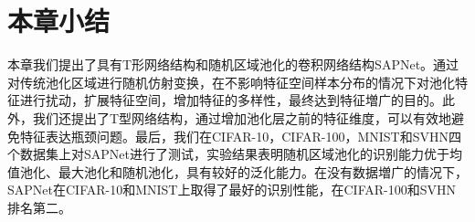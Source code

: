 \section{本章小结}
\label{sec:sap:conclude}


本章我们提出了具有T形网络结构和随机区域池化的卷积网络结构SAPNet。通过对传统池化区域进行随机仿射变换，在不影响特征空间样本分布的情况下对池化特征进行扰动，扩展特征空间，增加特征的多样性，最终达到特征増广的目的。此外，我们还提出了T型网络结构，通过增加池化层之前的特征维度，可以有效地避免特征表达瓶颈问题。最后，我们在CIFAR-10，CIFAR-100，MNIST和SVHN四个数据集上对SAPNet进行了测试，实验结果表明随机区域池化的识别能力优于均值池化、最大池化和随机池化，具有较好的泛化能力。在没有数据増广的情况下，SAPNet在CIFAR-10和MNIST上取得了最好的识别性能，在CIFAR-100和SVHN排名第二。














